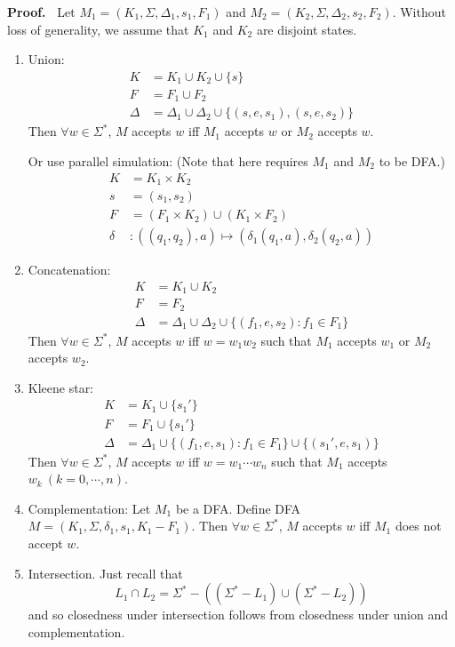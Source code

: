 \documentclass[aps,pra,onecolumn,notitlepage,superscriptaddress]{revtex4-1}
\def\Proof{{\bf Proof.~}}
\begin{document}
    \Proof
    Let $M_1 = (K_1, \Sigma, \Delta_1, s_1, F_1)$
    and $M_2 = (K_2, \Sigma, \Delta_2, s_2, F_2)$. Without loss of generality, we assume that $K_1$ and $K_2$ are disjoint states. 
    \begin{enumerate}
        \item Union:
        \begin{align*}
            K &= K_1 \cup K_2 \cup \{ s \} \\
            F &= F_1 \cup F_2 \\
            \Delta &= \Delta_1 \cup \Delta_2 \cup \{ (s,e,s_1),(s,e,s_2) \}
        \end{align*}
        Then $\forall w \in \Sigma^*$, $M$ accepts $w$ iff $M_1$ accepts $w$ or $M_2$ accepts $w$.
        
        Or use parallel simulation: (Note that here requires $M_1$ and $M_2$ to be DFA.)
        \begin{align*}
            K &= K_1 \times K_2 \\
            s &= (s_1, s_2) \\
            F &= (F_1 \times K_2) \cup (K_1 \times F_2) \\
            \delta &: ((q_1,q_2),a) \mapsto (\delta_1(q_1,a), \delta_2(q_2,a))
        \end{align*}
        \item Concatenation:
        \begin{align*}
            K &= K_1 \cup K_2 \\
            F &= F_2 \\
            \Delta &= \Delta_1 \cup \Delta_2 \cup \{ (f_1,e,s_2) : f_1 \in F_1 \}
        \end{align*}
        Then $\forall w \in \Sigma^*$, $M$ accepts $w$ iff $w=w_1w_2$ such that $M_1$ accepts $w_1$ or $M_2$ accepts $w_2$.
        \item Kleene star:
        \begin{align*}
            K &= K_1 \cup \{ s_1' \} \\
            F &= F_1 \cup \{ s_1' \} \\
            \Delta &= \Delta_1 \cup \{ (f_1,e,s_1) : f_1 \in F_1 \} \cup \{ (s_1',e,s_1) \}
        \end{align*}
        Then $\forall w \in \Sigma^*$, $M$ accepts $w$ iff $w=w_1\cdots w_n$ such that $M_1$ accepts $w_k \ (k=0,\cdots,n)$.
        \item Complementation: Let $M_1$ be a DFA. Define DFA $M = (K_1, \Sigma, \delta_1, s_1, K_1-F_1)$.
        Then $\forall w \in \Sigma^*$, $M$ accepts $w$ iff $M_1$ does not accept $w$.
        \item Intersection. Just recall that
        \begin{equation}
            L_1 \cap L_2 = \Sigma^* - ((\Sigma^*-L_1)\cup(\Sigma^*-L_2))
        \end{equation}
        and so closedness under intersection follows from closedness under union and complementation.


\end{enumerate}
\end{document}
